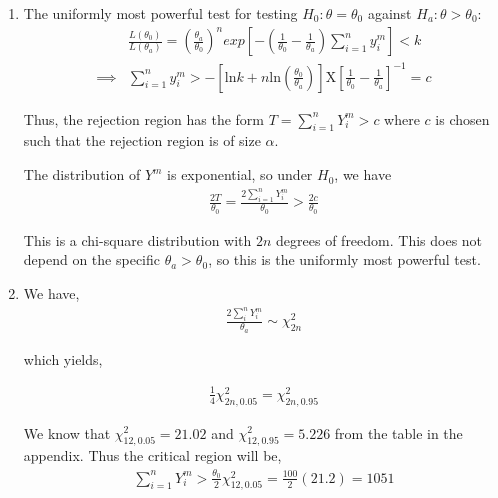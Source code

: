 \documentclass[12pt]{article}
\begin{document}
\begin{enumerate}[label=\alph*)]
	\item The uniformly most powerful test for testing $H_0: \theta = \theta_0$ against $H_a: \theta > \theta_0$:\\
	\begin{align*}
		&\frac{L(\theta_0)}{L(\theta_a)} = \left(\frac{\theta_a}{\theta_0}\right)^n exp\left[-\left(\frac{1}{\theta_0} - \frac{1}{\theta_a}\right) \sum_{i=1}^n y_i^m\right] < k\\
		\implies &\sum_{i=1}^n y_i^m > -\left[\text{ln}k + n\text{ln}\left(\frac{\theta_0}{\theta_a}\right)\right] \text{X} \left[\frac{1}{\theta_0} - \frac{1}{\theta_a}\right]^{-1} = c
	\end{align*}
	
	Thus, the rejection region has the form $T = \sum_{i=1}^n Y_i^m > c$ where $c$ is chosen such that the rejection region is of size $\alpha$.
	
	The distribution of $Y^m$ is exponential, so under $H_0$, we have
	\begin{align*}
		\frac{2T}{\theta_0} = \frac{2\sum_{i=1}^n Y_i^m}{\theta_0} > \frac{2c}{\theta_0}
	\end{align*}
	
	This is a chi-square distribution with $2n$ degrees of freedom. This does not depend on the specific $\theta_a > \theta_0$, so this is the uniformly most powerful test.
	
	\item We have,
	\begin{align*}
		\frac{2\sum_{i}^{n} Y_i^m}{\theta_a} \sim \chi_{2n}^2
	\end{align*}
	
	which yields,
	
	\begin{align*}
		\frac{1}{4} \chi_{2n, 0.05}^2 = \chi_{2n, 0.95}^2
	\end{align*}
	
	We know that $\chi_{12, 0.05}^2 = 21.02$ and $\chi_{12, 0.95}^2 = 5.226$ from the table in the appendix. Thus the critical region will be,
	\begin{align*}
		\sum_{i=1}^{n} Y_i^m > \frac{\theta_0}{2}\chi_{12, 0.05}^2 = \frac{100}{2}(21.2) = 1051
	\end{align*}
\end{enumerate}
\end{document}
